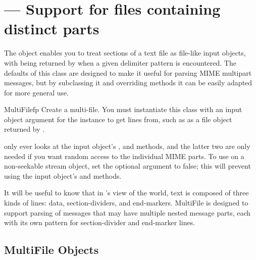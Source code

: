 \section{ ---
         Support for files containing distinct parts}



The  object enables you to treat sections of a text
file as file-like input objects, with  being returned by
 when a given delimiter pattern is encountered.  The
defaults of this class are designed to make it useful for parsing
MIME multipart messages, but by subclassing it and overriding methods 
it can be easily adapted for more general use.

\begin{classdesc}{MultiFile}{fp}
Create a multi-file.  You must instantiate this class with an input
object argument for the  instance to get lines from,
such as as a file object returned by .

 only ever looks at the input object's
,  and  methods, and
the latter two are only needed if you want random access to the
individual MIME parts. To use  on a non-seekable
stream object, set the optional  argument to false; this
will prevent using the input object's  and
 methods.
\end{classdesc}

It will be useful to know that in 's view of the world, text
is composed of three kinds of lines: data, section-dividers, and
end-markers.  MultiFile is designed to support parsing of
messages that may have multiple nested message parts, each with its
own pattern for section-divider and end-marker lines.

\begin{seealso}
\end{seealso}


\subsection{MultiFile Objects \label{MultiFile-objects}}

